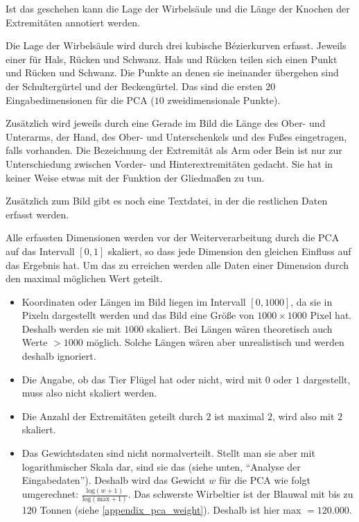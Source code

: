  Ist das geschehen kann die Lage der Wirbelsäule und die Länge der Knochen der Extremitäten annotiert werden.
 
 Die Lage der Wirbelsäule wird durch drei kubische Bézierkurven erfasst. Jeweils einer für Hals, Rücken und Schwanz. Hals und Rücken teilen sich einen Punkt und Rücken und Schwanz. Die Punkte an denen sie ineinander übergehen sind der Schultergürtel und der Beckengürtel.
 Das sind die ersten $20$ Eingabedimensionen für die PCA ($10$ zweidimensionale Punkte).
 
 Zusätzlich wird jeweils durch eine Gerade im Bild die Länge des Ober- und Unterarms, der Hand, des Ober- und Unterschenkels und des Fußes eingetragen, falls vorhanden. Die Bezeichnung der Extremität als Arm oder Bein ist nur zur Unterschiedung zwischen Vorder- und Hinterextremitäten gedacht. Sie hat in keiner Weise etwas mit der Funktion der Gliedmaßen zu tun.
 
 Zusätzlich zum Bild gibt es noch eine Textdatei, in der die restlichen Daten erfasst werden.

 Alle erfassten Dimensionen werden vor der Weiterverarbeitung durch die PCA auf das Intervall $[0, 1]$ skaliert, so dass jede Dimension den gleichen Einfluss auf das Ergebnis hat. 
 Um das zu erreichen werden alle Daten einer Dimension durch den maximal möglichen Wert geteilt.
 
 \begin{itemize}
  \item Koordinaten oder Längen im Bild liegen im Intervall $[0, 1000]$, da sie in Pixeln dargestellt werden und das Bild eine Größe von $1000 \times 1000$ Pixel hat. Deshalb werden sie mit $1000$ skaliert. Bei Längen wären theoretisch auch Werte $> 1000$ möglich. Solche Längen wären aber unrealistisch und werden deshalb ignoriert.
  
  \item Die Angabe, ob das Tier Flügel hat oder nicht, wird mit $0$ oder $1$ dargestellt, muss also nicht skaliert werden.
  
  \item Die Anzahl der Extremitäten geteilt durch $2$ ist maximal $2$, wird also mit $2$ skaliert.
  
  \item Das Gewichtsdaten sind nicht normalverteilt. Stellt man sie aber mit logarithmischer Skala dar, sind sie das (siehe unten, "`Analyse der Eingabedaten"'). Deshalb wird das Gewicht $w$ für die PCA wie folgt umgerechnet: $\frac{\mathrm{log}(w+1)}{\mathrm{log}(\mathrm{max}+1)}$. Das schwerste Wirbeltier ist der Blauwal mit bis zu 120 Tonnen (siehe \ref{appendix_pca_weight}). Deshalb ist hier max $= 120.000$.
\end{itemize}


